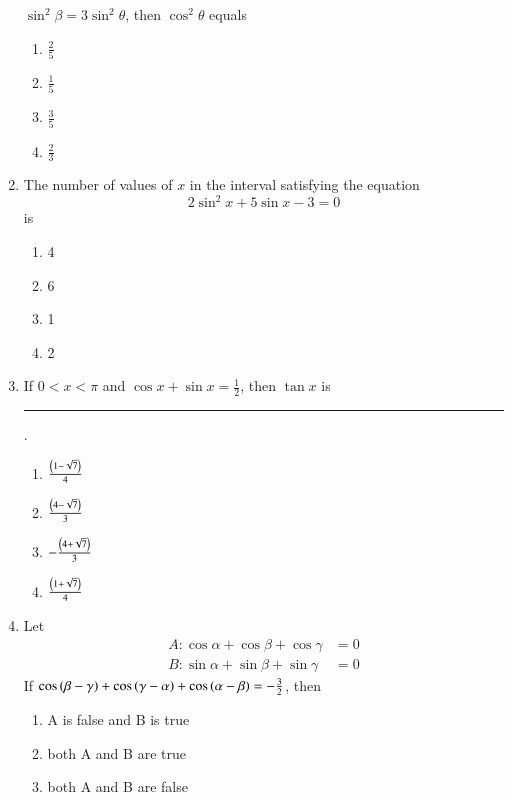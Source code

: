 \begin{enumerate}[label=\thesubsection.\arabic*,ref=\thesubsection.\theenumi]
$\sin^2 \beta=3\sin^2 \theta$, then $\cos^2 \theta$ equals \hfill{}
\begin{multicols}{4} 
\begin{enumerate}
\item $\frac{2}{5}$
\item $\frac{1}{5}$
\columnbreak
\item $\frac{3}{5}$
\item $\frac{2}{3}$
\end{enumerate} 
\end{multicols}
\item The number of values of $x$ in the interval  satisfying the equation 
%
$$2\sin^2 x+5\sin x-3=0$$  is  \hfill{}
\begin{multicols}{4}
\begin{enumerate}
\item 4
\columnbreak
\item 6
\columnbreak
\item 1
\columnbreak
\item 2
\end{enumerate} 
\end{multicols}
\item If $0<x<\pi$ and $\cos x+\sin x=\frac{1}{2}$, then $\tan x$  is \rule{1cm}{0.1pt}. 
\hfill{}
\begin{multicols}{4} 
\begin{enumerate}
\item $\frac{\left(1-\sqrt{7}\right)}{4}$
\item $\frac{\left(4-\sqrt{7}\right)}{3}$
\columnbreak
\item $-\frac{\left(4+\sqrt{7}\right)}{3}$
\item $\frac{\left(1+\sqrt{7}\right)}{4}$
\end{enumerate} 
\end{multicols}
\item Let 
	\begin{align*}
		{A}:\cos\alpha+\cos\beta+\cos\gamma&=0
\\
		{B}:\sin\alpha+\sin\beta+\sin\gamma&=0
\end{align*}
If $\cos\left(\beta-\gamma\right)+\cos\left(\gamma-\alpha\right)+\cos\left(\alpha-\beta\right)=-\frac{3}{2}$, then
\hfill{}
\begin{multicols}{2} 
\begin{enumerate}
\item {A} is false and {B} is true 
\item both {A} and {B} are true
\item both {A} and {B} are false 

\end{enumerate}
\end{multicols}
\end{enumerate}
